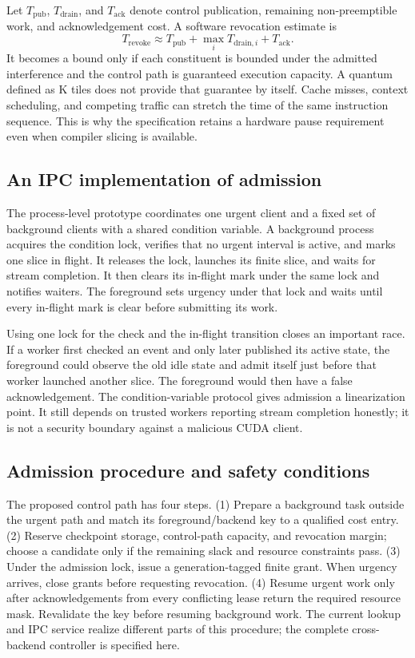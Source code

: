 Let $T_{\mathrm{pub}}$, $T_{\mathrm{drain}}$, and $T_{\mathrm{ack}}$ denote
control publication, remaining non-preemptible work, and acknowledgement
cost. A software revocation estimate is
\begin{equation}
 T_{\mathrm{revoke}}\approx
 T_{\mathrm{pub}}+\max_i T_{\mathrm{drain},i}+T_{\mathrm{ack}}.
\end{equation}
It becomes a bound only if each constituent is bounded under the admitted
interference and the control path is guaranteed execution capacity. A quantum
defined as K tiles does not provide that guarantee by itself. Cache misses,
context scheduling, and competing traffic can stretch the time of the same
instruction sequence. This is why the specification retains a hardware
pause requirement even when compiler slicing is available.

\subsection{An IPC implementation of admission}
The process-level prototype coordinates one urgent client and a fixed set
of background clients with a shared condition variable. A background process
acquires the condition lock, verifies that no urgent interval is active, and
marks one slice in flight. It releases the lock, launches its finite slice,
and waits for stream completion. It then clears its in-flight mark under
the same lock and notifies waiters. The foreground sets urgency under that
lock and waits until every in-flight mark is clear before submitting its work.

Using one lock for the check and the in-flight transition closes an important
race. If a worker first checked an event and only later published its active
state, the foreground could observe the old idle state and admit itself just
before that worker launched another slice. The foreground would then have a
false acknowledgement. The condition-variable protocol gives admission a
linearization point. It still depends on trusted workers reporting stream
completion honestly; it is not a security boundary against a malicious CUDA
client.

\subsection{Admission procedure and safety conditions}
The proposed control path has four steps. (1) Prepare a background task outside
the urgent path and match its foreground/backend key to a qualified cost entry.
(2) Reserve checkpoint storage, control-path capacity, and revocation margin;
choose a candidate only if the remaining slack and resource constraints pass.
(3) Under the admission lock, issue a generation-tagged finite grant. When
urgency arrives, close grants before requesting revocation. (4) Resume urgent
work only after acknowledgements from every conflicting lease return the
required resource mask. Revalidate the key before resuming background work.
The current lookup and IPC service realize different parts of this procedure;
the complete cross-backend controller is specified here.

